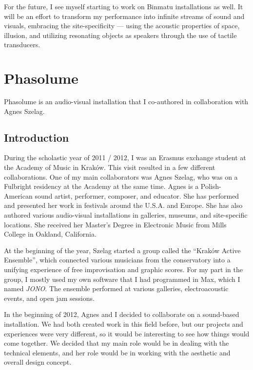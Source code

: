 \documentclass[12pt,a4paper,oneside]{report}
\begin{document}
For the future, I see myself starting to work on Binmatu installations as well. It will be an effort to transform my performance into infinite streams of sound and visuals, embracing the site-specificity --- using the acoustic properties of space, illusion, and utilizing resonating objects as speakers through the use of tactile transducers.


\section{Phasolume} Phasolume is an audio-visual installation that I co-authored in collaboration with Agnes Szelag.

\subsection{Introduction} 

During the scholastic year of 2011 / 2012, I was an Erasmus exchange student at the Academy of Music in Kraków. This visit resulted in a few different collaborations. One of my main collaborators was Agnes Szelag, who was on a Fulbright residency at the Academy at the same time.  Agnes is a Polish-American sound artist, performer, composer, and educator. She has performed and presented her work in festivals around the U.S.A. and Europe. She has also authored various audio-visual installations in galleries, museums, and site-specific locations. She received her Master’s Degree in Electronic Music from Mills College in Oakland, California.

At the beginning of the year, Szelag started a group called the ``Kraków Active Ensemble'', which connected various musicians from the conservatory into a unifying experience of free improvisation and graphic scores. For my part in the group, I mostly used my own software that I had programmed in Max, which I named \emph{JONO}. The ensemble performed at various galleries, electroacoustic events, and open jam sessions.

In the beginning of 2012, Agnes and I decided to collaborate on a sound-based installation. We had both created work in this field before, but our projects and experiences were very different, so it would be interesting to see how things would come together.  We decided that my main role would be in dealing with the technical elements, and her role would be in working with the aesthetic and overall design concept.
\end{document}
